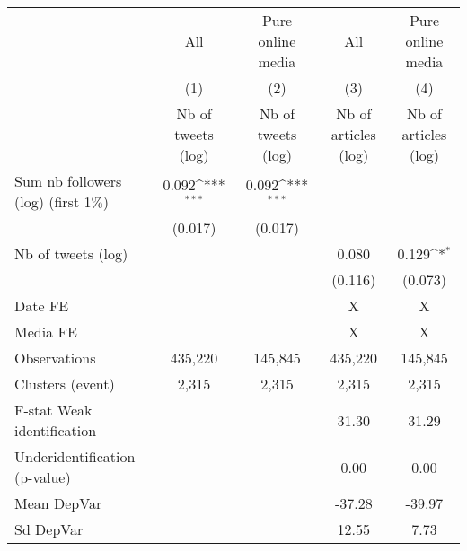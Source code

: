 {
\def\sym#1{\ifmmode^{#1}\else\(^{#1}\)\fi}
\begin{tabular}{l*{4}{c}}
\hline\hline
                    &\multicolumn{1}{c}{All}&\multicolumn{1}{c}{Pure online media}&\multicolumn{1}{c}{All}&\multicolumn{1}{c}{Pure online media}\\\cmidrule(lr){2-2}\cmidrule(lr){3-3}\cmidrule(lr){4-4}\cmidrule(lr){5-5}
                    &\multicolumn{1}{c}{(1)}&\multicolumn{1}{c}{(2)}&\multicolumn{1}{c}{(3)}&\multicolumn{1}{c}{(4)}\\
                    &\multicolumn{1}{c}{Nb of tweets (log)}&\multicolumn{1}{c}{Nb of tweets (log)}&\multicolumn{1}{c}{Nb of articles (log)}&\multicolumn{1}{c}{Nb of articles (log)}\\
\hline
Sum nb followers (log) (first 1$\%$)&       0.092\sym{***}&       0.092\sym{***}&                     &                     \\
                    &     (0.017)         &     (0.017)         &                     &                     \\
Nb of tweets (log)  &                     &                     &       0.080         &       0.129\sym{*}  \\
                    &                     &                     &     (0.116)         &     (0.073)         \\
\hline
Date FE             &                     &                     &           X         &           X         \\
Media FE            &                     &                     &           X         &           X         \\
Observations        &     435,220         &     145,845         &     435,220         &     145,845         \\
Clusters (event)    &       2,315         &       2,315         &       2,315         &       2,315         \\
F-stat Weak identification&                     &                     &       31.30         &       31.29         \\
Underidentification (p-value)&                     &                     &        0.00         &        0.00         \\
Mean DepVar         &                     &                     &      -37.28         &      -39.97         \\
Sd DepVar           &                     &                     &       12.55         &        7.73         \\
\hline\hline
\end{tabular}
}
